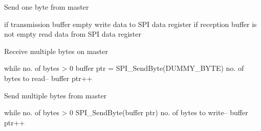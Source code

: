 \begin{algorithm}
\caption{Send one byte from master}\label{alg:send-master}
\begin{algorithmic}[1]
\State if transmission buffer empty
\State write data to SPI data register
\State if reception buffer is not empty
\State read data from SPI data register
\EndProcedure
\end{algorithmic}
\end{algorithm}

\begin{algorithm}
\caption{Receive multiple bytes on master}\label{alg:receive-multiple-master}
\begin{algorithmic}[1]
\State while no. of bytes > 0
\State buffer ptr = SPI_SendByte(DUMMY_BYTE)
\State no. of bytes to read--
\State buffer ptr++
\EndProcedure
\end{algorithmic}
\end{algorithm}

\begin{algorithm}
\caption{Send multiple bytes from master}\label{alg:send-multiple-master}
\begin{algorithmic}[1]
\State while no. of bytes > 0
\State SPI_SendByte(buffer ptr)
\State no. of bytes to write--
\State buffer ptr++
\EndProcedure
\end{algorithmic}
\end{algorithm}